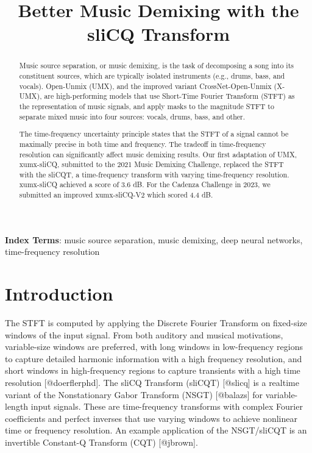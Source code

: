 \documentclass{INTERSPEECH2023}
\title{Better Music Demixing with the sliCQ Transform}
\begin{document}
\maketitle
 
\begin{abstract}
Music source separation, or music demixing, is the task of decomposing a song into its constituent sources, which are typically isolated instruments (e.g., drums, bass, and vocals). Open-Unmix (UMX), and the improved variant CrossNet-Open-Unmix (X-UMX), are high-performing models that use Short-Time Fourier Transform (STFT) as the representation of music signals, and apply masks to the magnitude STFT to separate mixed music into four sources: vocals, drums, bass, and other.

The time-frequency uncertainty principle states that the STFT of a signal cannot be maximally precise in both time and frequency. The tradeoff in time-frequency resolution can significantly affect music demixing results. Our first adaptation of UMX, xumx-sliCQ, submitted to the 2021 Music Demixing Challenge, replaced the STFT with the sliCQT, a time-frequency transform with varying time-frequency resolution. xumx-sliCQ achieved a score of 3.6 dB. For the Cadenza Challenge in 2023, we submitted an improved xumx-sliCQ-V2 which scored 4.4 dB.
\end{abstract}
\noindent\textbf{Index Terms}: music source separation, music demixing, deep neural networks, time-frequency resolution

\section{Introduction}

The STFT is computed by applying the Discrete Fourier Transform on fixed-size windows of the input signal. From both auditory and musical motivations, variable-size windows are preferred, with long windows in low-frequency regions to capture detailed harmonic information with a high frequency resolution, and short windows in high-frequency regions to capture transients with a high time resolution [@doerflerphd]. The sliCQ Transform (sliCQT) [@slicq] is a realtime variant of the Nonstationary Gabor Transform (NSGT) [@balazs] for variable-length input signals. These are time-frequency transforms with complex Fourier coefficients and perfect inverses that use varying windows to achieve nonlinear time or frequency resolution. An example application of the NSGT/sliCQT is an invertible Constant-Q Transform (CQT) [@jbrown].
\end{document}
